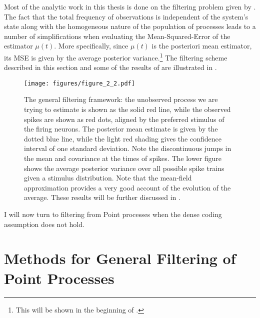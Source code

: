 {Most of the analytic work in this thesis is done on the filtering problem given by . The fact that the total frequency of observations is independent of 
the system's state along with the homogeneous nature of the population of processes leads to a number of simplifications when evaluating the
Mean-Squared-Error of the estimator $\mu(t)$. More specifically, since $\mu(t)$ is the posteriori mean estimator, its MSE is 
given by the average posterior variance.\footnote{This will be shown in the beginning of .}
The filtering scheme described in this section and some of the results of  are illustrated in .
\begin{figure}
\label{fig:matern_coding}
\texttt{[image: figures/figure\_2\_2.pdf]}
\caption[Online decoding of a spike train.]{The general filtering framework: the unobserved process we are trying to estimate is shown as the solid red line, while the observed spikes are
shown as red dots, aligned by the preferred stimulus of the firing neurons. The posterior mean estimate is given by the dotted blue line, while the light red shading
gives the confidence interval of one standard deviation. Note the discontinuous jumps in the mean and covariance at the times of spikes. The lower figure shows the
average posterior variance over all possible spike trains given a stimulus distribution. Note that the mean-field approximation provides a very good account of the
evolution of the average. These results will be further discussed in .}
\end{figure}

I will now turn to filtering from Point processes when the dense coding assumption does not hold.

\section{Methods for General Filtering of Point Processes}

}
